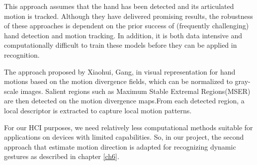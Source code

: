 This approach assumes that the hand has been detected and its articulated motion is tracked. Although they have delivered promising results, the robustness of these approaches is dependent on the prior success of (frequently challenging) hand detection and motion tracking. In addition, it is both data intensive and computationally difficult to train these models before they can be applied in recognition.
\bigskip

The approach proposed by Xiaohui, Gang, in \cite{dynamic2} visual representation for hand motions based on the motion divergence fields, which can be normalized to gray-scale images. Salient regions such as Maximum Stable Extremal Regions(MSER) are then detected on the motion divergence maps.From each detected region, a local descriptor is extracted to capture local motion patterns.
\bigskip

 For our HCI purposes, we need relatively less computational methods suitable for applications on devices with limited capabilities. So, in our project, the second approach that estimate motion direction\cite{dynamic2} is adapted for recognizing dynamic gestures as described in chapter \ref{ch6}.
 
 